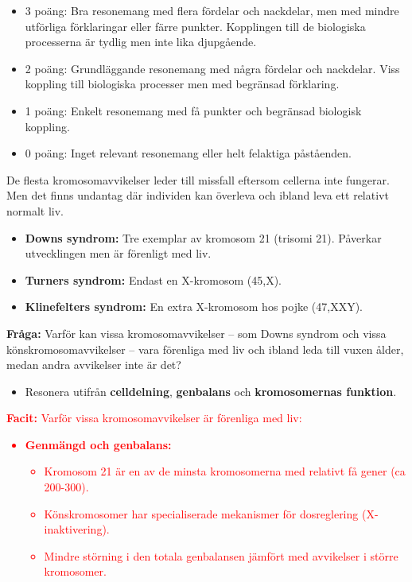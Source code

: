 \documentclass{exam}
\newcommand{\facit}[1]{\textcolor{red}{\textbf{Facit:} #1}}
\begin{document}
\begin{questions}
{\begin{itemize}
  \item 3 poäng: Bra resonemang med flera fördelar och nackdelar, men med mindre utförliga förklaringar eller färre punkter. Kopplingen till de biologiska processerna är tydlig men inte lika djupgående.
  
  \item 2 poäng: Grundläggande resonemang med några fördelar och nackdelar. Viss koppling till biologiska processer men med begränsad förklaring.
  
  \item 1 poäng: Enkelt resonemang med få punkter och begränsad biologisk koppling.
  
  \item 0 poäng: Inget relevant resonemang eller helt felaktiga påståenden.
\end{itemize}
}

\break

\question
De flesta kromosomavvikelser leder till missfall eftersom cellerna inte fungerar. Men det finns undantag där individen kan överleva och ibland leva ett relativt normalt liv.

\begin{itemize}
  \item \textbf{Downs syndrom:} Tre exemplar av kromosom 21 (trisomi 21). Påverkar utvecklingen men är förenligt med liv.
  \item \textbf{Turners syndrom:} Endast en X-kromosom (45,X).
  \item \textbf{Klinefelters syndrom:} En extra X-kromosom hos pojke (47,XXY).
\end{itemize}

\textbf{Fråga:} Varför kan vissa kromosomavvikelser – som Downs syndrom och vissa könskromosomavvikelser – vara förenliga med liv och ibland leda till vuxen ålder, medan andra avvikelser inte är det?

\begin{itemize}
  \item Resonera utifrån \textbf{celldelning}, \textbf{genbalans} och \textbf{kromosomernas funktion}.
\end{itemize}

\facit{
Varför vissa kromosomavvikelser är förenliga med liv:
\begin{itemize}
  \item \textbf{Genmängd och genbalans:} 
    \begin{itemize}
      \item Kromosom 21 är en av de minsta kromosomerna med relativt få gener (ca 200-300).
      \item Könskromosomer har specialiserade mekanismer för dosreglering (X-inaktivering).
      \item Mindre störning i den totala genbalansen jämfört med avvikelser i större kromosomer.
    \end{itemize}
  

\end{itemize}}
\end{questions}
\end{document}
